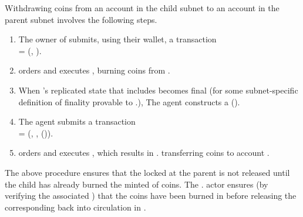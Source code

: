 Withdrawing  coins from an account  in the child subnet  to an account  in the parent subnet 
involves the following steps.

\begin{enumerate}

    \item The owner of  submits, using their wallet, a transaction\\
     = (, ).
    
    \item {} orders and executes , burning  coins from .%
    
    \item When 's replicated state that includes  becomes final (for some subnet-specific definition of finality provable to .),
    The \ipc agent constructs a {\pof}().
    
    \item The \ipc agent submits a transaction\\
     = (, , {\pof}()).
    
    \item {} orders and executes , which results in . transferring  coins to account .
    
\end{enumerate}

The above procedure ensures that the locked  at the parent is not released until the child has already burned the minted  of coins.
The . actor ensures (by verifying the associated \pof) that the coins have been burned in 
before releasing the corresponding  back into circulation in .

